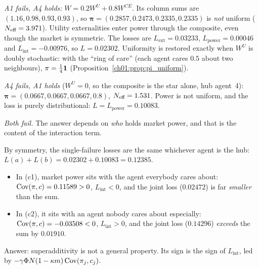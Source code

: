 \documentclass[../solutions_manual.tex]{subfiles}
\begin{document}
 \emph{A1 fails, A4 holds:} $W = 0.2W^U + 0.8W^{CE}$. Its column sums are $(1.16, 0.98, 0.93, 0.93)$, so $\boldsymbol\pi = (0.2857, 0.2473, 0.2335, 0.2335)$ is \emph{not} uniform ($N_{\text{eff}} = 3.971$). Utility externalities enter power through the composite, even though the market is symmetric. The losses are $L_{\text{ext}} = 0.03233$, $L_{\text{power}} = 0.00046$ and $L_{\text{int}} = -0.00976$, so $L = 0.02302$. Uniformity is restored exactly when $W^U$ is doubly stochastic: with the ``ring of care'' (each agent cares $0.5$ about two neighbours), $\pi = \frac14\mathbf{1}$ (Proposition~\ref{ch01:prop:pi_uniform}).

 \emph{A4 fails, A1 holds} ($W^U = 0$, so the composite is the star alone, hub agent~4): $\boldsymbol\pi = (0.0667, 0.0667, 0.0667, 0.8)$, $N_{\text{eff}} = 1.531$. Power is not uniform, and the loss is purely distributional: $L = L_{\text{power}} = 0.10083$.

 \emph{Both fail.} The answer depends on \emph{who} holds market power, and that is the content of the interaction term.
\begin{center}
\end{center}
By symmetry, the single-failure losses are the same whichever agent is the hub: $L(a) + L(b) = 0.02302 + 0.10083 = 0.12385$.
\begin{itemize}
\item In (c1), market power sits with the agent everybody cares about: $\operatorname{Cov}(\pi, c) = 0.11589 > 0$, $L_{\text{int}} < 0$, and the joint loss ($0.02472$) is far \emph{smaller} than the sum.
\item In (c2), it sits with an agent nobody cares about especially: $\operatorname{Cov}(\pi, c) = -0.03508 < 0$, $L_{\text{int}} > 0$, and the joint loss ($0.14296$) \emph{exceeds} the sum by $0.01910$.
\end{itemize}
Answer: superadditivity is not a general property. Its sign is the sign of $L_{\text{int}}$, led by $-\gamma\Phi N(1-\kappa m)\operatorname{Cov}(\pi_j, c_j)$.
\end{document}

